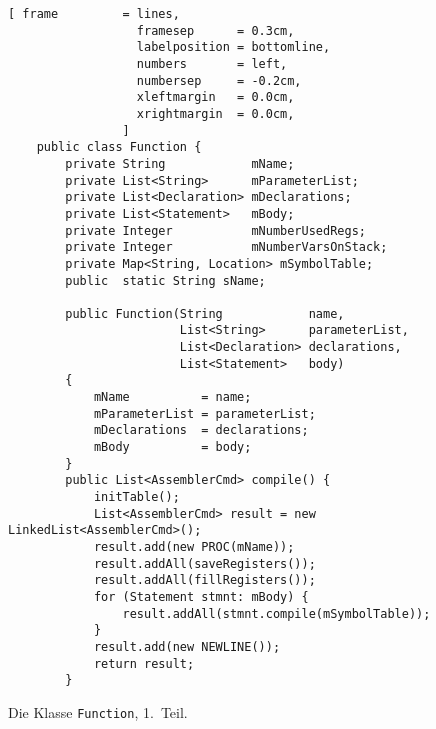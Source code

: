 \begin{figure}[!ht]
\centering
\begin{Verbatim}[ frame         = lines, 
                  framesep      = 0.3cm, 
                  labelposition = bottomline,
                  numbers       = left,
                  numbersep     = -0.2cm,
                  xleftmargin   = 0.0cm,
                  xrightmargin  = 0.0cm,
                ]
    public class Function {
        private String            mName;
        private List<String>      mParameterList;
        private List<Declaration> mDeclarations;
        private List<Statement>   mBody;
        private Integer           mNumberUsedRegs;
        private Integer           mNumberVarsOnStack;
        private Map<String, Location> mSymbolTable;    
        public  static String sName;
    
        public Function(String            name, 
                        List<String>      parameterList, 
                        List<Declaration> declarations, 
                        List<Statement>   body) 
        {
            mName          = name;
            mParameterList = parameterList;
            mDeclarations  = declarations;
            mBody          = body;
        }
        public List<AssemblerCmd> compile() {
            initTable();
            List<AssemblerCmd> result = new LinkedList<AssemblerCmd>();
            result.add(new PROC(mName));
            result.addAll(saveRegisters());
            result.addAll(fillRegisters());
            for (Statement stmnt: mBody) {
                result.addAll(stmnt.compile(mSymbolTable));
            }
            result.add(new NEWLINE());
            return result;
        }
\end{Verbatim} 
\vspace*{-0.3cm} %
\caption{Die Klasse \texttt{Function}, 1.~Teil.}
\label{fig:Function.java-SRP-1}
\end{figure}

